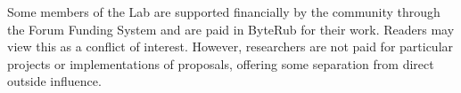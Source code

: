 \documentclass[12pt,english]{mrl}
\theoremstyle{definition}
\numberwithin{equation}{section}
\numberwithin{figure}{section}
\numberwithin{equation}{section}
\numberwithin{equation}{section}
\numberwithin{figure}{section}
\begin{document}
Some members of the Lab are supported financially by the community through the Forum Funding System and are paid in ByteRub for their work. Readers may view this as a conflict of interest. However, researchers are not paid for particular projects or implementations of proposals, offering some separation from direct outside influence.


\medskip{}



\end{document}
